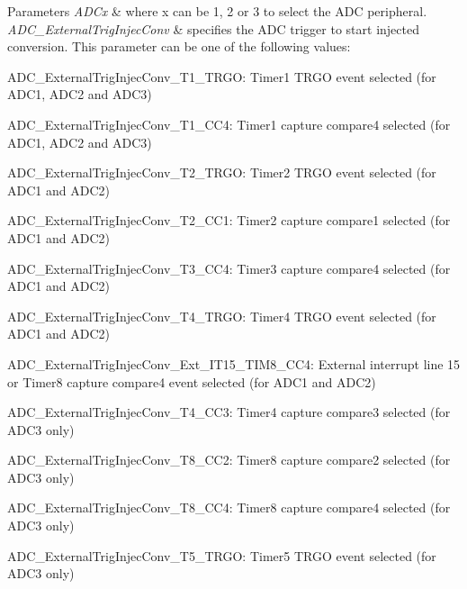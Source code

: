 \begin{DoxyParams}{Parameters}
{\em A\+D\+Cx} & where x can be 1, 2 or 3 to select the A\+DC peripheral. \\
\hline
{\em A\+D\+C\+\_\+\+External\+Trig\+Injec\+Conv} & specifies the A\+DC trigger to start injected conversion. This parameter can be one of the following values\+: \begin{DoxyItemize}
\item A\+D\+C\+\_\+\+External\+Trig\+Injec\+Conv\+\_\+\+T1\+\_\+\+T\+R\+GO\+: Timer1 T\+R\+GO event selected (for A\+D\+C1, A\+D\+C2 and A\+D\+C3) \item A\+D\+C\+\_\+\+External\+Trig\+Injec\+Conv\+\_\+\+T1\+\_\+\+C\+C4\+: Timer1 capture compare4 selected (for A\+D\+C1, A\+D\+C2 and A\+D\+C3) \item A\+D\+C\+\_\+\+External\+Trig\+Injec\+Conv\+\_\+\+T2\+\_\+\+T\+R\+GO\+: Timer2 T\+R\+GO event selected (for A\+D\+C1 and A\+D\+C2) \item A\+D\+C\+\_\+\+External\+Trig\+Injec\+Conv\+\_\+\+T2\+\_\+\+C\+C1\+: Timer2 capture compare1 selected (for A\+D\+C1 and A\+D\+C2) \item A\+D\+C\+\_\+\+External\+Trig\+Injec\+Conv\+\_\+\+T3\+\_\+\+C\+C4\+: Timer3 capture compare4 selected (for A\+D\+C1 and A\+D\+C2) \item A\+D\+C\+\_\+\+External\+Trig\+Injec\+Conv\+\_\+\+T4\+\_\+\+T\+R\+GO\+: Timer4 T\+R\+GO event selected (for A\+D\+C1 and A\+D\+C2) \item A\+D\+C\+\_\+\+External\+Trig\+Injec\+Conv\+\_\+\+Ext\+\_\+\+I\+T15\+\_\+\+T\+I\+M8\+\_\+\+C\+C4\+: External interrupt line 15 or Timer8 capture compare4 event selected (for A\+D\+C1 and A\+D\+C2)\end{DoxyItemize}
\begin{DoxyItemize}
\item A\+D\+C\+\_\+\+External\+Trig\+Injec\+Conv\+\_\+\+T4\+\_\+\+C\+C3\+: Timer4 capture compare3 selected (for A\+D\+C3 only) \item A\+D\+C\+\_\+\+External\+Trig\+Injec\+Conv\+\_\+\+T8\+\_\+\+C\+C2\+: Timer8 capture compare2 selected (for A\+D\+C3 only)\end{DoxyItemize}
\begin{DoxyItemize}
\item A\+D\+C\+\_\+\+External\+Trig\+Injec\+Conv\+\_\+\+T8\+\_\+\+C\+C4\+: Timer8 capture compare4 selected (for A\+D\+C3 only) \item A\+D\+C\+\_\+\+External\+Trig\+Injec\+Conv\+\_\+\+T5\+\_\+\+T\+R\+GO\+: Timer5 T\+R\+GO event selected (for A\+D\+C3 only)\end{DoxyItemize}

\end{DoxyParams}
